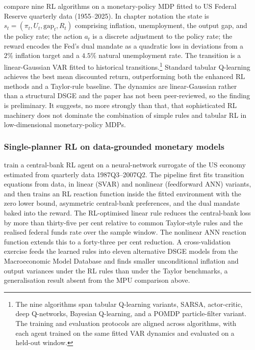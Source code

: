 \citet{Wang2025mpu} compare nine RL algorithms on a monetary-policy
MDP fitted to US Federal Reserve quarterly data (1955--2025). In
chapter notation the state is $s_t = (\pi_t, U_t, \mathrm{gap}_t,
R_t)$ comprising inflation, unemployment, the output gap, and the
policy rate; the action $a_t$ is a discrete adjustment to the policy
rate; the reward encodes the Fed's dual mandate as a quadratic loss
in deviations from a $2\%$ inflation target and a $4.5\%$ natural
unemployment rate. The transition is a linear-Gaussian VAR fitted to
historical transitions.\footnote{The nine algorithms span tabular
Q-learning variants, SARSA, actor-critic, deep Q-networks, Bayesian
Q-learning, and a POMDP particle-filter variant. The training and
evaluation protocols are aligned across algorithms, with each agent
trained on the same fitted VAR dynamics and evaluated on a held-out
window.} Standard tabular Q-learning achieves the best mean
discounted return, outperforming both the enhanced RL methods and a
Taylor-rule baseline. The dynamics are linear-Gaussian rather than a
structural DSGE and the paper has not been peer-reviewed, so the
finding is preliminary. It suggests, no more strongly than that, that
sophisticated RL machinery does not dominate the combination of
simple rules and tabular RL in low-dimensional monetary-policy MDPs.

\subsubsection{Single-planner RL on data-grounded monetary models}
\label{sec:macro:ht-ks}

\citet{HinterlangTaenzer2024} train a central-bank RL agent on a
neural-network surrogate of the US economy estimated from quarterly
data 1987Q3--2007Q2. The pipeline first fits transition equations
from data, in linear (SVAR) and nonlinear (feedforward ANN) variants,
and then trains an RL reaction function inside the fitted environment
with the zero lower bound, asymmetric central-bank preferences, and
the dual mandate baked into the reward. The RL-optimised linear rule
reduces the central-bank loss by more than thirty-five per cent
relative to common Taylor-style rules and the realised federal funds
rate over the sample window. The nonlinear ANN reaction function
extends this to a forty-three per cent reduction. A
cross-validation exercise feeds the learned rules into eleven
alternative DSGE models from the Macroeconomic Model Database and
finds smaller unconditional inflation and output variances under the
RL rules than under the Taylor benchmarks, a generalisation result
absent from the MPU comparison above.

